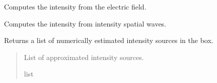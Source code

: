 \documentclass[letterpaper,10pt,english]{sphinxmanual}
\begin{document}
\begin{fulllineitems}

\begin{fulllineitems}
\label{\detokenize{source/Box:Box.Box.compute_intensity_from_electric_field}}
\pysigstartsignatures
\pysiglinewithargsret
{}
{}
{}
\pysigstopsignatures
\sphinxAtStartPar
Computes the intensity from the electric field.

\end{fulllineitems}


\begin{fulllineitems}
\label{\detokenize{source/Box:Box.Box.compute_intensity_from_spatial_waves}}
\pysigstartsignatures
\pysiglinewithargsret
{}
{}
{}
\pysigstopsignatures
\sphinxAtStartPar
Computes the intensity from intensity spatial waves.

\end{fulllineitems}


\begin{fulllineitems}
\label{\detokenize{source/Box:Box.Box.get_approximated_intensity_sources}}
\pysigstartsignatures
\pysiglinewithargsret
{}
{}
{}
\pysigstopsignatures
\sphinxAtStartPar
Returns a list of numerically estimated intensity sources in the box.
\begin{quote}\begin{description}
\sphinxAtStartPar
List of approximated intensity sources.

\sphinxAtStartPar
list

\end{description}\end{quote}

\end{fulllineitems}



\end{fulllineitems}
\end{document}

